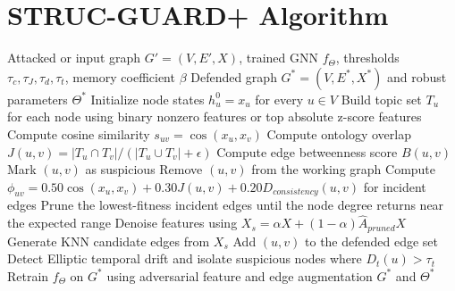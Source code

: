 \documentclass[12pt,oneside]{report}
\begin{document}
\section{STRUC-GUARD+ Algorithm}
\begin{algorithm}[H]
\caption{STRUC-GUARD+ with Ontology-Driven Self-Healing}
\begin{algorithmic}[1]
\REQUIRE Attacked or input graph $G'=(V,E',X)$, trained GNN $f_\Theta$, thresholds $\tau_c,\tau_J,\tau_d,\tau_t$, memory coefficient $\beta$
\ENSURE Defended graph $G^*=(V,E^*,X^*)$ and robust parameters $\Theta^*$
\STATE Initialize node states $h_u^{0}=x_u$ for every $u\in V$
\STATE Build topic set $T_u$ for each node using binary nonzero features or top absolute z-score features
    \STATE Compute cosine similarity $s_{uv}=\cos(x_u,x_v)$
    \STATE Compute ontology overlap $J(u,v)=|T_u\cap T_v|/(|T_u\cup T_v|+\epsilon)$
    \STATE Compute edge betweenness score $B(u,v)$
        \STATE Mark $(u,v)$ as suspicious
    \ENDIF
\ENDFOR
{}
        \STATE Remove $(u,v)$ from the working graph
    \ENDIF
\ENDFOR
{}
    \STATE Compute $\phi_{uv}=0.50\cos(x_u,x_v)+0.30J(u,v)+0.20D_{consistency}(u,v)$ for incident edges
    \STATE Prune the lowest-fitness incident edges until the node degree returns near the expected range
\ENDFOR
\STATE Denoise features using $X_s=\alpha X+(1-\alpha)\hat{A}_{pruned}X$
\STATE Generate KNN candidate edges from $X_s$
        \STATE Add $(u,v)$ to the defended edge set
    \ENDIF
\ENDFOR
\STATE Detect Elliptic temporal drift and isolate suspicious nodes where $D_t(u)>\tau_t$
\STATE Retrain $f_\Theta$ on $G^*$ using adversarial feature and edge augmentation
\RETURN $G^*$ and $\Theta^*$
\end{algorithmic}
\end{algorithm}
\end{document}
